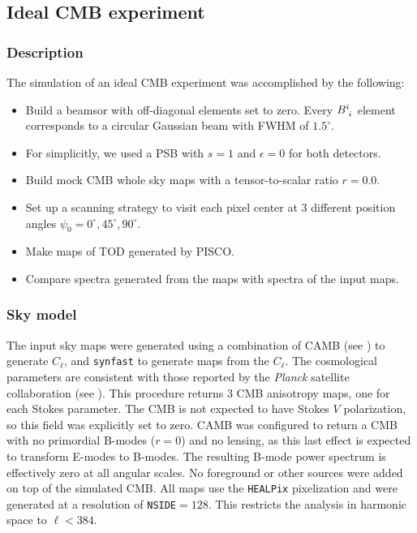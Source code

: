 \documentclass[a4paper,11pt]{article}
\begin{document}
\subsection{Ideal CMB experiment}
\label{subsec::ideal_full_sky}

\subsubsection{Description}

The simulation of an ideal CMB experiment was accomplished by the following:

\begin{itemize}
    \item Build a beamsor with off-diagonal elements set to zero. Every $\tensor{B}{^i_i}$ element corresponds to a circular Gaussian beam with FWHM of $1.5^\circ$. 
    \item For simplicitly, we used a PSB with $s=1$ and $\epsilon=0$ for both detectors.
    \item Build mock CMB whole sky maps with a tensor-to-scalar ratio $r=0.0$.
	\item Set up a scanning strategy to visit each pixel center at 3 different position angles $\psi_0 = 0^{\circ},45^{\circ},90^{\circ}$. 
	\item Make maps of TOD generated by PISCO. 
	\item Compare spectra generated from the maps with spectra of the input maps.
\end{itemize}

\subsubsection{Sky model}
\label{subsec::sky_model}

The input sky maps were generated using a combination of CAMB (see \cite{Lewis:2002ah}) to generate $C_\ell$, and \texttt{synfast} to generate maps from the $C_\ell$. The cosmological parameters are consistent with those reported by the \textsl{Planck} satellite collaboration (see \cite{2016A&A...594A..13P}). This procedure returns 3 CMB anisotropy maps, one for each Stokes parameter. The CMB is not expected to have Stokes $V$ polarization, so this field was explicitly set to zero. CAMB was configured to return a CMB with no primordial B-modes ($r=0$) and no lensing, as this last effect is expected to transform E-modes to B-modes. The resulting B-mode power spectrum is effectively zero at all angular scales. No foreground or other sources were added on top of the simulated CMB. All maps use the \texttt{HEALPix} pixelization and were generated at a resolution of \texttt{NSIDE}$=128$. This restricts the analysis in harmonic space to $\ell < 384$.
\end{document}
